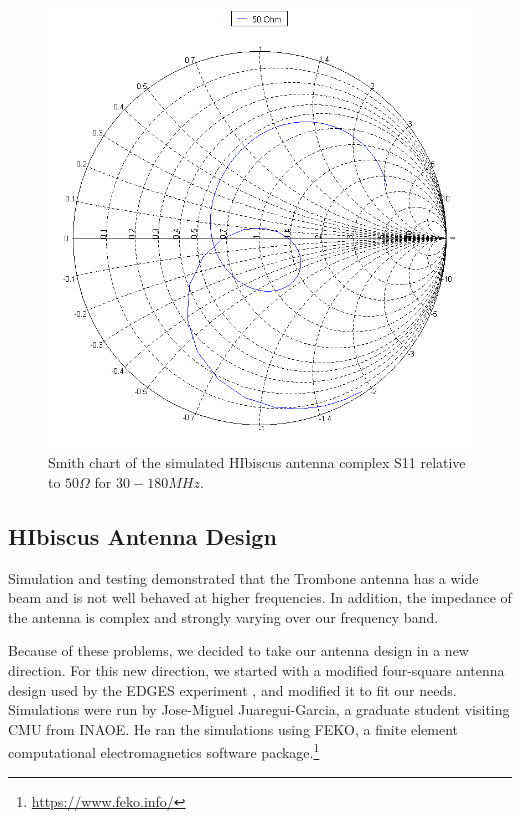 \begin{figure}[htb]
\begin{minipage}[b]{0.46\textwidth}
\includegraphics[width=0.95\linewidth]{SCIHI_system/figures/HIbiscus_S11_50_Smith.png}
\caption{Smith chart of the simulated HIbiscus antenna complex S11 relative to $50 \Omega$ for $30 - 180 MHz$.}
\label{Fig:HIsim_S11_Smith}
\end{minipage}
\end{figure}


\subsection{HIbiscus Antenna Design}

Simulation and testing demonstrated that the Trombone antenna has a wide beam and is not well behaved at higher frequencies. In addition, the impedance of the antenna is complex and strongly varying over our frequency band. 

Because of these problems, we decided to take our antenna design in a new direction. For this new direction, we started with a modified four-square antenna design used by the EDGES experiment \cite{bowman_2008}\cite{rogers_2008}, and modified it to fit our needs. Simulations were run by Jose-Miguel Juaregui-Garcia, a graduate student visiting CMU from INAOE. He ran the simulations using FEKO, a finite element computational electromagnetics software package.\footnote{\url{https://www.feko.info/}} 


